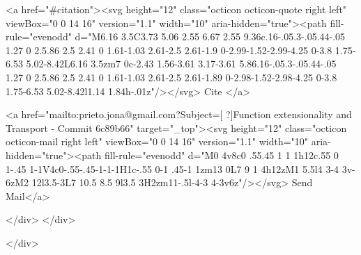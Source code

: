       <a  href="#citation"><svg height="12" class="octicon octicon-quote right left" viewBox="0 0 14 16" version="1.1" width="10" aria-hidden="true"><path fill-rule="evenodd" d="M6.16 3.5C3.73 5.06 2.55 6.67 2.55 9.36c.16-.05.3-.05.44-.05 1.27 0 2.5.86 2.5 2.41 0 1.61-1.03 2.61-2.5 2.61-1.9 0-2.99-1.52-2.99-4.25 0-3.8 1.75-6.53 5.02-8.42L6.16 3.5zm7 0c-2.43 1.56-3.61 3.17-3.61 5.86.16-.05.3-.05.44-.05 1.27 0 2.5.86 2.5 2.41 0 1.61-1.03 2.61-2.5 2.61-1.89 0-2.98-1.52-2.98-4.25 0-3.8 1.75-6.53 5.02-8.42l1.14 1.84h-.01z"/></svg> Cite
      </a>

      <a href="mailto:prieto.jona@gmail.com?Subject=[ ?]Function extensionality and Transport - Commit 6c89b66" target="_top"><svg height="12" class="octicon octicon-mail right left" viewBox="0 0 14 16" version="1.1" width="10" aria-hidden="true"><path fill-rule="evenodd" d="M0 4v8c0 .55.45 1 1 1h12c.55 0 1-.45 1-1V4c0-.55-.45-1-1-1H1c-.55 0-1 .45-1 1zm13 0L7 9 1 4h12zM1 5.5l4 3-4 3v-6zM2 12l3.5-3L7 10.5 8.5 9l3.5 3H2zm11-.5l-4-3 4-3v6z"/></svg> Send Mail</a>

    </div>
  </div>

</div>




